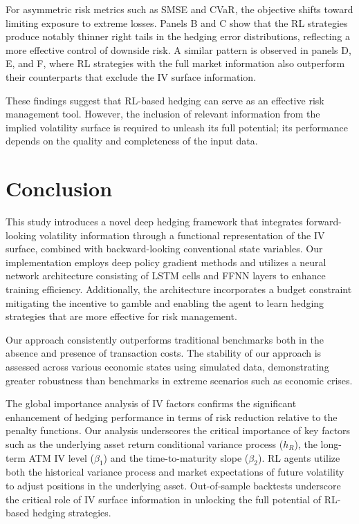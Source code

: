 \documentclass[12pt]{article}
\begin{document}
For asymmetric risk metrics such as SMSE and CVaR, the objective shifts toward limiting exposure to extreme losses. Panels B and C show that the RL strategies produce notably thinner right tails in the hedging error distributions, reflecting a more effective control of downside risk. A similar pattern is observed in panels D, E, and F, where RL strategies with the full market information also outperform their counterparts that exclude the IV surface information.

These findings suggest that RL-based hedging can serve as an effective risk management tool. However, the inclusion of relevant information from the implied volatility surface is required to unleash its full potential; its performance depends on the quality and completeness of the input data.







\section{Conclusion}\label{se:conclusion}

This study introduces a novel deep hedging framework that integrates forward-looking volatility information through a functional representation of the IV surface, combined with backward-looking conventional state variables. Our implementation employs deep policy gradient methods and utilizes a neural network architecture consisting of LSTM cells and FFNN layers to enhance training efficiency. Additionally, the architecture incorporates a budget constraint mitigating the incentive to gamble and enabling the agent to learn hedging strategies that are more effective for risk management.

Our approach consistently outperforms traditional benchmarks both in the absence and presence of transaction costs. The stability of our approach is assessed across various economic states using simulated data, demonstrating greater robustness than benchmarks in extreme scenarios such as economic crises.

The global importance analysis of IV factors confirms the significant enhancement of hedging performance in terms of risk reduction relative to the penalty functions. Our analysis underscores the critical importance of key factors such as the underlying asset return conditional variance process ($h_{R}$), the long-term ATM IV level ($\beta_{1}$) and the time-to-maturity slope ($\beta_{2}$). RL agents utilize both the historical variance process and market expectations of future volatility to adjust positions in the underlying asset. 
Out-of-sample backtests underscore the critical role of IV surface information in unlocking the full potential of RL-based hedging strategies.
\end{document}
